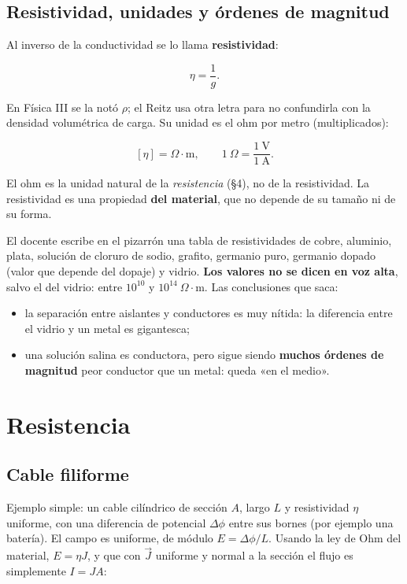 \documentclass[12pt,a4paper]{article}
\begin{document}
\subsection{Resistividad, unidades y órdenes de magnitud}

Al inverso de la conductividad se lo llama \textbf{resistividad}:

\[
\eta = \frac{1}{g} .
\]

En Física III se la notó $\rho$; el Reitz usa otra letra para no confundirla con
la densidad volumétrica de carga. Su unidad es el ohm por metro (multiplicados):

\[
[\eta] = \Omega\cdot\text{m}, \qquad 1\ \Omega = \frac{1\ \text{V}}{1\ \text{A}} .
\]

El ohm es la unidad natural de la \emph{resistencia} (§4), no de la resistividad. La
resistividad es una propiedad \textbf{del material}, que no depende de su tamaño ni
de su forma.

El docente escribe en el pizarrón una tabla de resistividades de cobre,
aluminio, plata, solución de cloruro de sodio, grafito, germanio puro, germanio
dopado (valor que depende del dopaje) y vidrio. \textbf{Los valores no se dicen en
voz alta}, salvo el del vidrio: entre $10^{10}$ y $10^{14}\ \Omega\cdot$m.
Las conclusiones que saca:

\begin{itemize}
  \item la separación entre aislantes y conductores es muy nítida: la diferencia
  entre el vidrio y un metal es gigantesca;
  \item una solución salina es conductora, pero sigue siendo \textbf{muchos órdenes de
  magnitud} peor conductor que un metal: queda «en el medio».
\end{itemize}

\section{Resistencia}

\subsection{Cable filiforme}

Ejemplo simple: un cable cilíndrico de sección $A$, largo $L$ y resistividad
$\eta$ uniforme, con una diferencia de potencial $\Delta\phi$ entre sus bornes
(por ejemplo una batería). El campo es uniforme, de módulo $E = \Delta\phi/L$.
Usando la ley de Ohm del material, $E = \eta J$, y que con $\vec J$ uniforme y
normal a la sección el flujo es simplemente $I = J A$:
\end{document}
